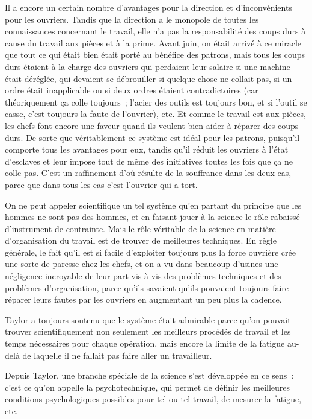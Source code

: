 \documentclass[french,twoside]{book} %
\begin{document}
Il a encore un certain nombre d'avantages pour la direction et d'inconvénients pour les ouvriers. Tandis que la direction a le monopole de toutes les connaissances concernant le travail, elle n'a pas la responsabilité des coups durs à cause du travail aux pièces et à la prime. Avant juin, on était arrivé à ce miracle que tout ce qui était bien était porté au bénéfice des patrons, mais tous les coups durs étaient à la charge des ouvriers qui perdaient leur salaire si une machine était déréglée, qui devaient se débrouiller si quelque chose ne collait pas, si un ordre était inapplicable ou si deux ordres étaient contradictoires (car théoriquement ça colle toujours ; l'acier des outils est toujours bon, et si l'outil se casse, c'est toujours la faute de l'ouvrier), etc. Et comme le travail est aux pièces, les chefs font encore une faveur quand ils veulent bien aider à réparer des coups durs. De sorte que véritablement ce système est idéal pour les patrons, puisqu'il comporte tous les avantages pour eux, tandis qu'il réduit les ouvriers à l'état d'esclaves et leur impose tout de même des initiatives toutes les fois que ça ne colle pas. C'est un raffinement d'où résulte de la souffrance dans les deux cas, parce que dans tous les cas c'est l'ouvrier qui a tort.\par
On ne peut appeler scientifique un tel système qu'en partant du principe que les hommes ne sont pas des hommes, et en faisant jouer à la science le rôle rabaissé d'instrument de contrainte. Mais le rôle véritable de la science en matière d'organisation du travail est de trouver de meilleures techniques. En règle générale, le fait qu'il est si facile d'exploiter toujours plus la force ouvrière crée une sorte de paresse chez les chefs, et on a vu dans beaucoup d'usines une négligence incroyable de leur part vis-à-vis des problèmes techniques et des problèmes d'organisation, parce qu'ils savaient qu'ils pouvaient toujours faire réparer leurs fautes par les ouvriers en augmentant un peu plus la cadence.\par
Taylor a toujours soutenu que le système était admirable parce qu'on pouvait trouver scientifiquement non seulement les meilleurs procédés de travail et les temps nécessaires pour chaque opération, mais encore la limite de la fatigue au-delà de laquelle il ne fallait pas faire aller un travailleur.\par
Depuis Taylor, une branche spéciale de la science s'est développée en ce sens : c'est ce qu'on appelle la psychotechnique, qui permet de définir les meilleures conditions psychologiques possibles pour tel ou tel travail, de mesurer la fatigue, etc.\par
\end{document}
